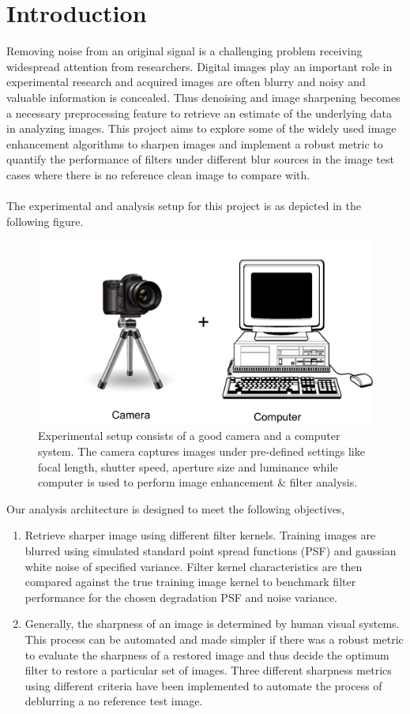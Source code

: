 \graphicspath{{mehul_pics/}}%

\chapter{Introduction}
Removing noise from an original signal is a challenging problem receiving widespread attention from researchers. Digital images play an important role in experimental research and acquired images are often blurry and noisy and valuable information is concealed. Thus denoising and image sharpening becomes a necessary  preprocessing feature to retrieve an estimate of the underlying data  in analyzing images. This project aims to explore some of the widely used image enhancement algorithms to sharpen images and implement a robust metric to quantify the performance of filters under different blur sources in the image test cases where there is no reference clean image to compare with.\\

\\
The experimental and analysis setup for this project is as depicted in the following figure.
\begin{figure}[h!]
  \centering
                \centering
                \includegraphics[width=.6\textwidth]{experimental_setup.png}
                \caption{Experimental setup consists of a good camera and a computer system. The camera captures images under pre-defined settings like focal length, shutter speed, aperture size and luminance while computer is used to perform image enhancement \& filter analysis.}
\end{figure}

\noindent Our analysis architecture is designed to meet the following objectives,
\begin{enumerate}
\item  Retrieve sharper image using different filter kernels. Training images are blurred using simulated standard point spread functions (PSF) and gaussian white noise of specified variance. Filter kernel characteristics are then compared against the true training image kernel to benchmark filter performance for the chosen degradation PSF and noise variance. 
\item Generally, the sharpness of an image is determined by human visual systems. This process can be automated and made simpler if there was a robust metric to evaluate the sharpness of a restored image and thus decide the optimum filter to restore a particular set of images. Three different sharpness metrics using different criteria have been implemented to automate the process of deblurring a no reference test image.
\end{enumerate}
\newpage